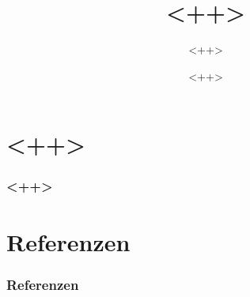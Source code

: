 \documentclass{beamer}
\title          {<++>}
\author         {<++>}
\institute      {<++>}
\date           {<++>}
\begin{document}
    \begin{frame}
    \maketitle
    \end{frame}

    \section{<++>}
    \begin{frame}
    \frametitle{<++>}

    \end{frame}

    \section{Referenzen}
    \begin{frame}
        \frametitle{Referenzen}
        \printbibliography
    \end{frame}
\end{document}
